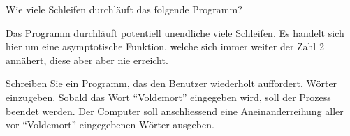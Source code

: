 \begin{mychallenge}
	Wie viele Schleifen durchläuft das folgende Programm?
	
	\begin{myanswer}
		Das Programm durchläuft potentiell unendliche viele Schleifen. Es handelt sich hier um eine asymptotische Funktion, welche sich immer weiter der Zahl 2 annähert, diese aber aber nie erreicht.
	\end{myanswer}
\end{mychallenge}

\begin{myexercise}
	Schreiben Sie ein Programm, das den Benutzer wiederholt auffordert, Wörter einzugeben. Sobald das Wort \enquote{Voldemort} eingegeben wird, soll der Prozess beendet werden. Der Computer soll anschliessend eine Aneinanderreihung aller vor \enquote{Voldemort} eingegebenen Wörter ausgeben.
	\begin{myanswer}
		
	\end{myanswer}
\end{myexercise}

